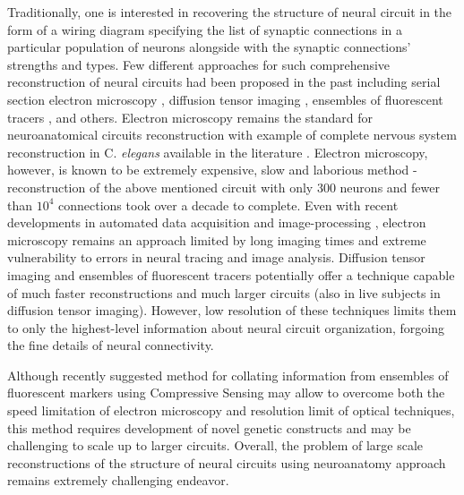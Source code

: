 Traditionally, one is interested in recovering the structure of neural circuit in the form of a wiring diagram specifying the list of synaptic connections in a particular population of neurons alongside with the synaptic connections' strengths and types. Few different approaches for such comprehensive reconstruction of neural circuits had been proposed in the past including serial section electron microscopy \cite{Briggman2006, Helmstaedter2009}, diffusion tensor imaging \cite{Hagmann2007, Hagmann2008}, ensembles of fluorescent tracers \cite{Bohland2009}, and others. Electron microscopy remains the standard for neuroanatomical circuits reconstruction with example of complete nervous system reconstruction in C. {\em elegans} available in the literature \cite{White1986, rswormatlas}. Electron microscopy, however, is known to be extremely expensive, slow and laborious method - reconstruction of the above mentioned circuit with only 300 neurons and fewer than $10^4$ connections took over a decade to complete. Even with recent developments in automated data acquisition \cite{DenkHorstmann04} and image-processing \cite{Mishchenko2009c, Jain2007, Jurrus2006}, electron microscopy remains an approach limited by long imaging times and extreme vulnerability to errors in neural tracing and image analysis. Diffusion tensor imaging \cite{Hagmann2007} and ensembles of fluorescent tracers \cite{Bohland2009} potentially offer a technique capable of much faster reconstructions and much larger circuits (also in live subjects in diffusion tensor imaging). However, low resolution of these techniques limits them to only the highest-level information about neural circuit organization, forgoing the fine details of neural connectivity. 

Although recently suggested method for collating information from ensembles of fluorescent markers using Compressive Sensing \cite{Mishchenko2009a, Mishchenko2009} may allow to overcome both the speed limitation of electron microscopy and resolution limit of optical techniques, this method requires development of novel genetic constructs and may be challenging to scale up to larger circuits. Overall, the problem of large scale reconstructions of the structure of neural circuits using neuroanatomy approach remains extremely challenging endeavor.


